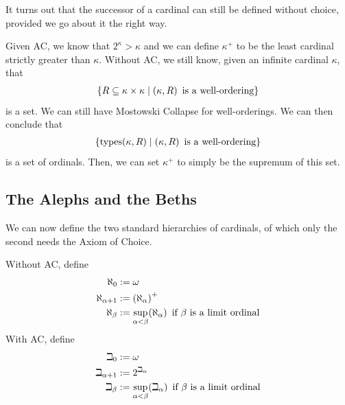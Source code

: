 It turns out that the successor of a cardinal can still be defined without choice, provided we go about it the right way.

Given AC, we know that $2^{\kappa} > \kappa$ and we can define $\kappa^{+}$ to be the least cardinal strictly greater than $\kappa$. Without AC, we still know, given an infinite cardinal $\kappa$, that
\begin{align*}
    \left\{ R \subseteq \kappa \times \kappa \; \middle\vert \; \left( \kappa, R \right) \text{ is a well-ordering} \right\}
\end{align*}
is a set. We can still have Mostowski Collapse for well-orderings. We can then conclude that
\begin{align*}
    \left\{ \text{types}\!\left( \kappa, R \right) \; \middle\vert \; \left( \kappa, R \right) \text{ is a well-ordering} \right\}
\end{align*}
is a set of ordinals. Then, we can set $\kappa^{+}$ to simply be the supremum of this set.

\subsection{The Alephs and the Beths}

We can now define the two standard hierarchies of cardinals, of which only the second needs the Axiom of Choice.

Without AC, define
\begin{align*}
    \aleph_0 &:= \omega \\
    \aleph_{\alpha + 1} &:= \left( \aleph_{\alpha} \right)^{+} \\
    \aleph_{\beta} &:= \sup_{\alpha < \beta}\!\left( \aleph_{\alpha} \right) \text{ if } \beta \text{ is a limit ordinal} 
\end{align*}
With AC, define
\begin{align*}
    \beth_0 &:= \omega \\
    \beth_{\alpha + 1} &:= 2^{\beth_{\alpha}} \\
    \beth_{\beta} &:= \sup_{\alpha < \beta}\!\left( \beth_{\alpha} \right) \text{ if } \beta \text{ is a limit ordinal}
\end{align*}


